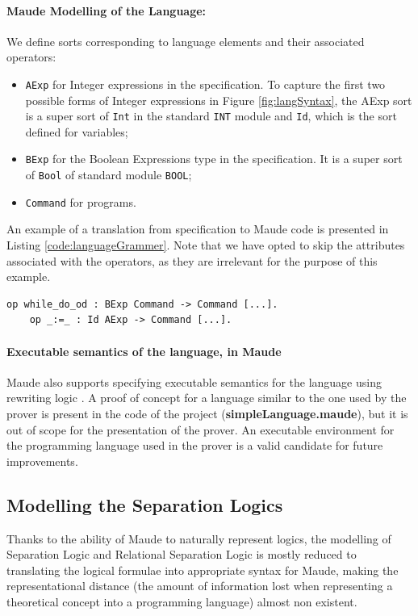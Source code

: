 \documentclass[12pt,a4paper]{article}
\begin{document}
	\paragraph{Maude Modelling of the Language:}
	We define sorts corresponding to language elements and their associated operators:
	\begin{itemize}
		\item \texttt{AExp} for Integer expressions in the specification. To capture the first two possible forms of Integer expressions in Figure \ref{fig:langSyntax}, the AExp sort is a super sort of \texttt{Int} in the standard \texttt{INT} module and \texttt{Id}, which is the sort defined for variables;
		\item \texttt{BExp} for the Boolean Expressions type in the specification. It is a super sort of \texttt{Bool} of standard module \texttt{BOOL}; 
		\item \texttt{Command} for programs.
	\end{itemize}
	An example of a translation from specification to Maude code is presented in Listing \ref{code:languageGrammer}. Note that we have opted to skip the attributes associated with the operators, as they are irrelevant for the purpose of this example.
	\\
	
	\begin{lstlisting}[label=code:languageGrammer,caption=Example of operator translation to Maude code]
	op while_do_od : BExp Command -> Command [...].
	op _:=_ : Id AExp -> Command [...]. 
	\end{lstlisting}
	
	\paragraph{Executable semantics of the language, in Maude}
	Maude also supports specifying executable semantics for the language using rewriting logic \cite{rewrConcurrency}. A proof of concept for a language similar to the one used by the prover is present in the code of the project (\textbf{simpleLanguage.maude}), but it is out of scope for the presentation of the prover. An executable environment for the programming language used in the prover is a valid candidate for future improvements.

 
\subsection{Modelling the Separation Logics}
Thanks to the ability of Maude to naturally represent logics, the modelling of Separation Logic and Relational Separation Logic is mostly reduced to translating the logical formulae into appropriate syntax for Maude, making the representational distance (the amount of information lost when representing a theoretical concept into a programming language) \cite{manual} almost non existent. \\
\end{document}
